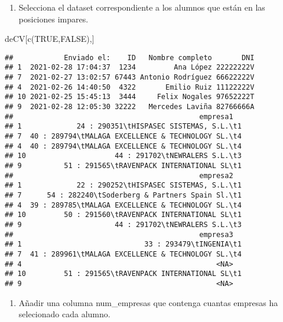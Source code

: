 \documentclass[
]{book}
\newenvironment{Shaded}{\begin{snugshade}}{\end{snugshade}}
\newcommand{\ConstantTok}[1]{\textcolor[rgb]{0.00,0.00,0.00}{#1}}
\newcommand{\FunctionTok}[1]{\textcolor[rgb]{0.00,0.00,0.00}{#1}}
\newcommand{\NormalTok}[1]{#1}
\providecommand{\tightlist}{%
  \setlength{\itemsep}{0pt}\setlength{\parskip}{0pt}}
\begin{document}
\begin{enumerate}
\def\labelenumi{\arabic{enumi}.}
\setcounter{enumi}{10}
\tightlist
\item
  Selecciona el dataset correspondiente a los alumnos que están en las posiciones impares.
\end{enumerate}

\begin{Shaded}
\begin{Highlighting}[]
\NormalTok{deCV[}\FunctionTok{c}\NormalTok{(}\ConstantTok{TRUE}\NormalTok{,}\ConstantTok{FALSE}\NormalTok{),]}
\end{Highlighting}
\end{Shaded}

\begin{verbatim}
##            Enviado el:    ID   Nombre completo       DNI
## 1  2021-02-28 17:04:37  1234         Ana López 22222222V
## 7  2021-02-27 13:02:57 67443 Antonio Rodríguez 66622222V
## 4  2021-02-26 14:40:50  4322       Emilio Ruiz 11122222V
## 10 2021-02-25 15:45:13  3444     Felix Nogales 97652222T
## 9  2021-02-28 12:05:30 32222   Mercedes Laviña 82766666A
##                                            empresa1
## 1             24 : 290351\tHISPASEC SISTEMAS, S.L.\t1
## 7  40 : 289794\tMALAGA EXCELLENCE & TECHNOLOGY SL.\t4
## 4  40 : 289794\tMALAGA EXCELLENCE & TECHNOLOGY SL.\t4
## 10                     44 : 291702\tNEWRALERS S.L.\t3
## 9          51 : 291565\tRAVENPACK INTERNATIONAL SL\t1
##                                            empresa2
## 1             22 : 290252\tHISPASEC SISTEMAS, S.L.\t1
## 7      54 : 282240\tSoderberg & Partners Spain Sl.\t1
## 4  39 : 289785\tMALAGA EXCELLENCE & TECHNOLOGY SL.\t4
## 10         50 : 291560\tRAVENPACK INTERNATIONAL SL\t1
## 9                      44 : 291702\tNEWRALERS S.L.\t3
##                                            empresa3
## 1                             33 : 293479\tINGENIA\t1
## 7  41 : 289961\tMALAGA EXCELLENCE & TECHNOLOGY SL.\t4
## 4                                              <NA>
## 10         51 : 291565\tRAVENPACK INTERNATIONAL SL\t1
## 9                                              <NA>
\end{verbatim}

\begin{enumerate}
\def\labelenumi{\arabic{enumi}.}
\setcounter{enumi}{11}
\tightlist
\item
  Añadir una columna num\_empresas que contenga cuantas empresas ha selecionado cada alumno.
\end{enumerate}
\end{document}
